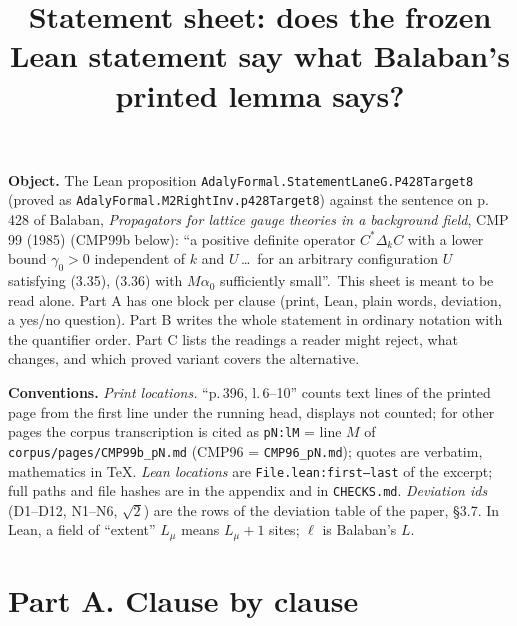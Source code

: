 \documentclass[10pt,a4paper]{article}
\title{\vspace{-8mm}\sffamily\large Statement sheet: does the frozen Lean statement say what Bala\-ban's printed lemma says?}
\date{}\author{}
\begin{document}
\maketitle\vspace{-12mm}
\fontsize{8.6}{10.2}\selectfont
\textbf{Object.} The Lean proposition \texttt{AdalyFormal.StatementLaneG.P428Target8} (proved as \texttt{AdalyFormal.M2RightInv.p428Target8}) against the sentence on p.\,428 of Bala\-ban, \emph{Propagators for lattice gauge theories in a background field}, CMP 99 (1985) (CMP99b below): ``a positive definite operator $C^*\Delta_kC$ with a lower bound $\gamma_0>0$ independent of $k$ and $U$\,\dots\ for an arbitrary configuration $U$ satisfying (3.35), (3.36) with $M\alpha_0$ sufficiently small''.\ This sheet is meant to be read alone. Part A has one block per clause (print, Lean, plain words, deviation, a yes/no question). Part B writes the whole statement in ordinary notation with the quantifier order. Part C lists the readings a reader might reject, what changes, and which proved variant covers the alternative.

\textbf{Conventions.} \emph{Print locations.} ``p.\,396, l.\,6--10'' counts text lines of the printed page from the first line under the running head, displays not counted; for other pages the corpus transcription is cited as \texttt{pN:lM} = line $M$ of \texttt{corpus/pages/CMP99b\_pN.md} (CMP96 = \texttt{CMP96\_pN.md}); quotes are verbatim, mathematics in \TeX. \emph{Lean locations} are \texttt{File.lean:first--last} of the excerpt; full paths and file hashes are in the appendix and in \texttt{CHECKS.md}. \emph{Deviation ids} (D1--D12, N1--N6, $\surd2$) are the rows of the deviation table of the paper, \S3.7. In Lean, a field of ``extent'' $L_\mu$ means $L_\mu+1$ sites; $\ell$ is Bala\-ban's $L$.

\section*{Part A. Clause by clause}
\end{document}
